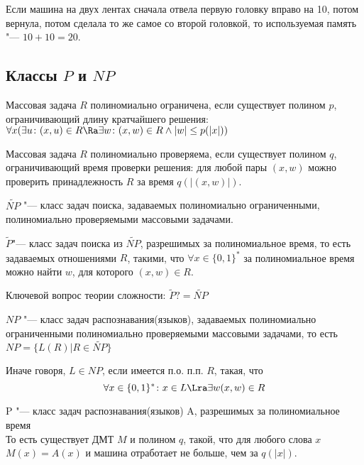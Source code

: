 \begin{exmp}
	Если машина на двух лентах сначала отвела первую головку вправо на 10, потом вернула, потом сделала то же самое со второй головкой,
	то используемая память "--- $10+10=20$.
\end{exmp}


\subsection{Классы $P$ и $NP$}
\begin{Def}
	Массовая задача $R$ полиномиально ограничена, если существует полином $p$, ограничивающий длину	кратчайшего решения:
	$\forall x(\exists u \colon (x, u) \in R \Ra \exists w \colon (x, w) \in R \wedge |w| \le p(|x|))$
\end{Def}
\begin{Def}
	Массовая задача $R$ полиномиально проверяема, если существует полином $q$, ограничивающий время проверки решения:
	для любой пары $(x, w)$ можно проверить принадлежность $R$ за время $q(|(x, w)|)$.
\end{Def}
\begin{Def}
	$\tilde {NP}$ "--- класс задач поиска, задаваемых полиномиально ограниченными, полиномиально проверяемыми массовыми задачами. 
\end{Def}
\begin{Def}
	$\tilde P$"--- класс задач поиска из $\tilde {NP}$, разрешимых за полиномиальное время, то есть задаваемых
	отношениями $R$, такими, что $\forall x \in \{0, 1\}^*$ за полиномиальное время можно найти $w$, для которого $(x, w) \in R$.
\end{Def}

\begin{Rem}
	Ключевой вопрос теории сложности: $\tilde P ?= \tilde {NP}$
\end{Rem}

\begin{Def}
	$NP$ "--- класс задач распознавания(языков), задаваемых полиномиально ограниченными полиномиально 
	проверяемыми массовыми задачами, то есть $NP = \{L(R)| R \in \tilde{NP}\}$

	Иначе говоря, $L \in NP$, если имеется п.о. п.п. $R$, такая, что 
	$$\forall x \in \{0, 1\}^* \colon x \in L \Lra \exists w (x, w) \in R$$
\end{Def}

\begin{Def}
	P "--- класс задач распознавания(языков) A, разрешимых за полиномиальное время\\
	То есть существует ДМТ $M$ и полином $q$, такой, что для любого слова $x$ $M(x)=A(x)$ и машина отработает не больше, чем за $q(|x|)$.
\end{Def}


